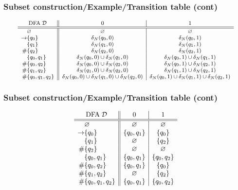 % 
\begin{frame}
\frametitle{Subset construction/Example/Transition table (cont)}
\[\footnotesize
\begin{array}{r@{}l||c|c}
\multicolumn{2}{c||}{\text{DFA} \; {\cal D}} & 0 & 1\\
\hline\hline
            & \varnothing & \varnothing & \varnothing\\
\rightarrow & \{q_0\} & \delta_N(q_0, 0) & \delta_N(q_0, 1)\\
            & \{q_1\} & \delta_N(q_1, 0) & \delta_N(q_1, 1)\\
         \# & \{q_2\} & \delta_N(q_2, 0) & \delta_N(q_2, 1)\\
            & \{q_0, q_1\} & \delta_N(q_0,0) \cup \delta_N(q_1,0) 
                           & \delta_N(q_0,1) \cup \delta_N(q_1,1)\\
         \# & \{q_0, q_2\} & \delta_N(q_0,0) \cup \delta_N(q_2,0) 
                           & \delta_N(q_0,1) \cup \delta_N(q_2,1)\\
         \# & \{q_1, q_2\} & \delta_N(q_1,0) \cup \delta_N(q_2,0) 
                           & \delta_N(q_1,1) \cup \delta_N(q_2,1)\\
         \# & \{q_0, q_1, q_2\} 
            & \delta_N(q_0,0) \cup \delta_N(q_1,0) \cup \delta_N(q_2,0)
            & \delta_N(q_0,1) \cup \delta_N(q_1,1) \cup \delta_N(q_2,1)
\end{array}
\]

\end{frame}

% 
\begin{frame}
\frametitle{Subset construction/Example/Transition table (cont)}
\[
\begin{array}{r@{}l||c|c}
\multicolumn{2}{c||}{\text{DFA} \; {\cal D}} & 0 & 1\\
\hline\hline
            & \varnothing & \varnothing & \varnothing\\
\rightarrow & \{q_0\} & \{q_0, q_1\} & \{q_0\}\\
            & \{q_1\} & \varnothing & \{q_2\}\\
         \# & \{q_2\} & \varnothing & \varnothing\\
            & \{q_0, q_1\} & \{q_0,q_1\} & \{q_0,q_2\}\\
         \# & \{q_0, q_2\} & \{q_0,q_1\} & \{q_0\}\\
         \# & \{q_1, q_2\} & \varnothing & \{q_2\}\\
         \# & \{q_0, q_1, q_2\} & \{q_0, q_1\} & \{q_0,q_2\}
\end{array}
\]

\end{frame}

